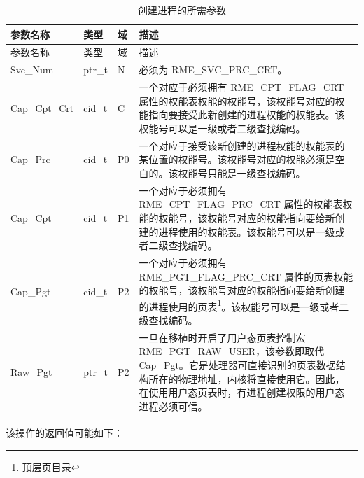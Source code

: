 \begin{xltabular}{\textwidth}{@{}>{\hsize\raggedright\arraybackslash}X>{\hsize\raggedright\arraybackslash}X>{\hsize\raggedright\arraybackslash}X>{\hsize\raggedright\arraybackslash}X@{}}
\caption{创建进程的所需参数}\label{tab:4-10-create-process-parameters}\\
\toprule
参数名称 & 类型 & 域 & 描述\tabularnewline
\endfirsthead
\toprule
参数名称 & 类型 & 域 & 描述\tabularnewline
\midrule
\endhead
\bottomrule
\endlastfoot
Svc\_Num & ptr\_t & N & 必须为 RME\_SVC\_PRC\_CRT。\tabularnewline
Cap\_Cpt\_Crt & cid\_t & C &
一个对应于必须拥有 RME\_CPT\_FLAG\_CRT 属性的权能表权能的权能号，该权能号对应的权能指向要接受此新创建的进程权能的权能表。该权能号可以是一级或者二级查找编码。\tabularnewline
Cap\_Prc & cid\_t & P0 &
一个对应于接受该新创建的进程权能的权能表的某位置的权能号。该权能号对应的权能必须是空白的。该权能号只能是一级查找编码。\tabularnewline
Cap\_Cpt & cid\_t & P1 &
一个对应于必须拥有 RME\_CPT\_FLAG\_PRC\_CRT 属性的权能表权能的权能号，该权能号对应的权能指向要给新创建的进程使用的权能表。该权能号可以是一级或者二级查找编码。\tabularnewline
Cap\_Pgt & cid\_t & P2 &
一个对应于必须拥有 RME\_PGT\_FLAG\_PRC\_CRT 属性的页表权能的权能号，该权能号对应的权能指向要给新创建的进程使用的页表\footnote{顶层页目录}。该权能号可以是一级或者二级查找编码。\tabularnewline
Raw\_Pgt & ptr\_t & P2 &
一旦在移植时开启了用户态页表控制宏 RME\_PGT\_RAW\_USER，该参数即取代 Cap\_Pgt。它是处理器可直接识别的页表数据结构所在的物理地址，内核将直接使用它。因此，在使用用户态页表时，有进程创建权限的用户态进程必须可信。\tabularnewline
\end{xltabular}

该操作的返回值可能如下：

